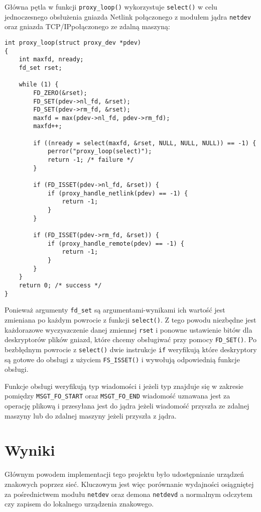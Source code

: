 \documentclass[10pt]{scrartcl}
\begin{document}
Główna pętla w funkcji \texttt{proxy\_loop()} wykorzystuje \texttt{select()} w celu jednoczesnego obsłużenia gniazda Netlink połączonego z modułem jądra \texttt{netdev} oraz gniazda TCP/IP\@ połączonego ze zdalną maszyną:

\begin{verbatim}
int proxy_loop(struct proxy_dev *pdev)
{
    int maxfd, nready;
    fd_set rset;

    while (1) {
        FD_ZERO(&rset);
        FD_SET(pdev->nl_fd, &rset);
        FD_SET(pdev->rm_fd, &rset);
        maxfd = max(pdev->nl_fd, pdev->rm_fd);
        maxfd++;

        if ((nready = select(maxfd, &rset, NULL, NULL, NULL)) == -1) {
            perror("proxy_loop(select)");
            return -1; /* failure */
        }

        if (FD_ISSET(pdev->nl_fd, &rset)) {
            if (proxy_handle_netlink(pdev) == -1) {
                return -1;
            }
        }

        if (FD_ISSET(pdev->rm_fd, &rset)) {
            if (proxy_handle_remote(pdev) == -1) {
                return -1;
            }
        }
    }
    return 0; /* success */
}
\end{verbatim}

Ponieważ argumenty \texttt{fd\_set} są argumentami-wynikami ich wartość jest zmieniana po każdym powrocie z funkcji \texttt{select()}. Z tego powodu niezbędne jest każdorazowe wyczyszczenie danej zmiennej \texttt{rset} i ponowne ustawienie bitów dla deskryptorów plików gniazd, które chcemy obsługiwać przy pomocy \texttt{FD\_SET()}. Po bezbłędnym powrocie z \texttt{select()} dwie instrukcje \texttt{if} weryfikują które deskryptory są gotowe do obsługi z użyciem \texttt{FS\_ISSET()} i wywołują odpowiednią funkcje obsługi.

Funkcje obsługi weryfikują typ wiadomości i jeżeli typ znajduje się w zakresie pomiędzy \texttt{MSGT\_FO\_START} oraz \texttt{MSGT\_FO\_END} wiadomość uznawana jest za operację plikową i przesyłana jest do jądra jeżeli wiadomość przyszła ze zdalnej maszyny lub do zdalnej maszyny jeżeli przyszła z jądra.

\section{Wyniki}

Głównym powodem implementacji tego projektu było udostępnianie urządzeń znakowych poprzez sieć. Kluczowym jest więc porównanie wydajności osiągniętej za pośrednictwem modułu \texttt{netdev} oraz demona \texttt{netdevd} a normalnym odczytem czy zapisem do lokalnego urządzenia znakowego.
\end{document}
